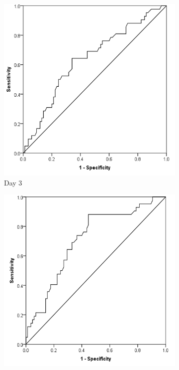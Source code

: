 \begin{figure}[t]
	\caption{Receiver operating characteristics curve analysis of C-reactive protein as a marker of postoperative infective complications.}
	\label{fig:crp_comp_ROC_infection}

	\centering
	\begin{subfigure}{0.3\textwidth}
		\centering
		\includegraphics[width=\textwidth]{Figures/crp_comp_ROC_infection_D3}
		\caption{Day 3}
		\label{fig:crp_comp_ROC_infection_D3}
	\end{subfigure}
	\hfill
	\begin{subfigure}{0.3\textwidth}
		\centering
		\includegraphics[width=\textwidth]{Figures/crp_comp_ROC_infection_D4}

\end{subfigure}
\end{figure}
